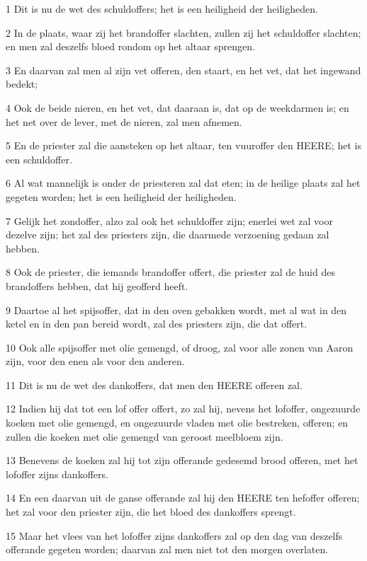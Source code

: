 \par 1 Dit is nu de wet des schuldoffers; het is een heiligheid der heiligheden.
\par 2 In de plaats, waar zij het brandoffer slachten, zullen zij het schuldoffer slachten; en men zal deszelfs bloed rondom op het altaar sprengen.
\par 3 En daarvan zal men al zijn vet offeren, den staart, en het vet, dat het ingewand bedekt;
\par 4 Ook de beide nieren, en het vet, dat daaraan is, dat op de weekdarmen is; en het net over de lever, met de nieren, zal men afnemen.
\par 5 En de priester zal die aansteken op het altaar, ten vuuroffer den HEERE; het is een schuldoffer.
\par 6 Al wat mannelijk is onder de priesteren zal dat eten; in de heilige plaats zal het gegeten worden; het is een heiligheid der heiligheden.
\par 7 Gelijk het zondoffer, alzo zal ook het schuldoffer zijn; enerlei wet zal voor dezelve zijn; het zal des priesters zijn, die daarmede verzoening gedaan zal hebben.
\par 8 Ook de priester, die iemands brandoffer offert, die priester zal de huid des brandoffers hebben, dat hij geofferd heeft.
\par 9 Daartoe al het spijsoffer, dat in den oven gebakken wordt, met al wat in den ketel en in den pan bereid wordt, zal des priesters zijn, die dat offert.
\par 10 Ook alle spijsoffer met olie gemengd, of droog, zal voor alle zonen van Aaron zijn, voor den enen als voor den anderen.
\par 11 Dit is nu de wet des dankoffers, dat men den HEERE offeren zal.
\par 12 Indien hij dat tot een lof offer offert, zo zal hij, nevens het lofoffer, ongezuurde koeken met olie gemengd, en ongezuurde vladen met olie bestreken, offeren; en zullen die koeken met olie gemengd van geroost meelbloem zijn.
\par 13 Benevens de koeken zal hij tot zijn offerande gedesemd brood offeren, met het lofoffer zijns dankoffers.
\par 14 En een daarvan uit de ganse offerande zal hij den HEERE ten hefoffer offeren; het zal voor den priester zijn, die het bloed des dankoffers sprengt.
\par 15 Maar het vlees van het lofoffer zijns dankoffers zal op den dag van deszelfs offerande gegeten worden; daarvan zal men niet tot den morgen overlaten.
